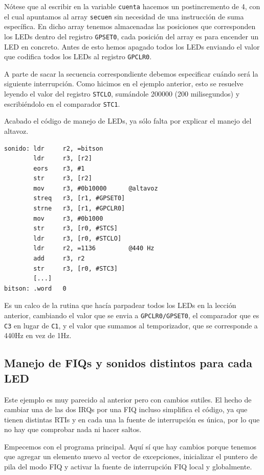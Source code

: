Nótese que al escribir en la variable {\tt cuenta} hacemos un postincremento de 4, con el
cual apuntamos al array {\tt secuen} sin necesidad de una instrucción de suma específica.
En dicho array tenemos almacenadas las posiciones que corresponden los LEDs dentro del
registro {\tt GPSET0}, cada posición del array es para encender un LED en concreto. Antes
de esto hemos apagado todos los LEDs enviando el valor que codifica todos los LEDs al
registro {\tt GPCLR0}.

A parte de sacar la secuencia correspondiente debemos especificar cuándo será la siguiente
interrupción. Como hicimos en el ejemplo anterior, esto se resuelve leyendo el valor del
registro {\tt STCLO}, sumándole 200000 (200 milisegundos) y escribiéndolo en el comparador
{\tt STC1}.

Acabado el código de manejo de LEDs, ya sólo falta por explicar el manejo del altavoz.

\begin{lstlisting}
sonido: ldr     r2, =bitson
        ldr     r3, [r2]
        eors    r3, #1
        str     r3, [r2]
        mov     r3, #0b10000      @altavoz
        streq   r3, [r1, #GPSET0]
        strne   r3, [r1, #GPCLR0]
        mov     r3, #0b1000
        str     r3, [r0, #STCS]
        ldr     r3, [r0, #STCLO]
        ldr     r2, =1136         @440 Hz
        add     r3, r2
        str     r3, [r0, #STC3]
        [...]
bitson: .word   0
\end{lstlisting}

Es un calco de la rutina que hacía parpadear todos los LEDs en la lección anterior, cambiando
el valor que se envia a {\tt GPCLR0/GPSET0}, el comparador que es {\tt C3} en lugar de {\tt C1},
y el valor que sumamos al temporizador, que se corresponde a 440Hz en vez de 1Hz.

\subsection{Manejo de FIQs y sonidos distintos para cada LED}

Este ejemplo es muy parecido al anterior pero con cambios sutiles. El hecho de cambiar una de
las dos IRQs por una FIQ incluso simplifica el código, ya que tienen distintas RTIs y en cada
una la fuente de interrupción es única, por lo que no hay que comprobar nada ni hacer saltos.

Empecemos con el programa principal. Aquí sí que hay cambios porque tenemos que agregar un
elemento nuevo al vector de excepciones, inicializar el puntero de pila del modo FIQ y activar
la fuente de interrupción FIQ local y globalmente.

